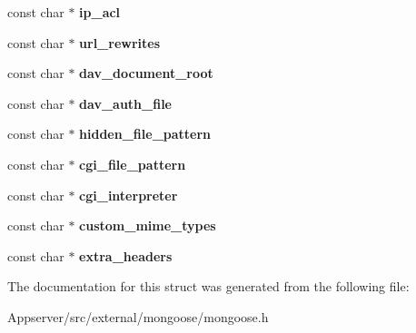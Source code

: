 \begin{DoxyCompactItemize}
\item 
const char $\ast$ {\bfseries ip\+\_\+acl}\hypertarget{structmg__serve__http__opts_a6227e7145e0543137d872add4d0e1851}{}\label{structmg__serve__http__opts_a6227e7145e0543137d872add4d0e1851}

\item 
const char $\ast$ {\bfseries url\+\_\+rewrites}\hypertarget{structmg__serve__http__opts_a3e1aad9c1180b840b44aa80d2190d82c}{}\label{structmg__serve__http__opts_a3e1aad9c1180b840b44aa80d2190d82c}

\item 
const char $\ast$ {\bfseries dav\+\_\+document\+\_\+root}\hypertarget{structmg__serve__http__opts_ae7463ec9b4042b02f1ab7e6a8c701e36}{}\label{structmg__serve__http__opts_ae7463ec9b4042b02f1ab7e6a8c701e36}

\item 
const char $\ast$ {\bfseries dav\+\_\+auth\+\_\+file}\hypertarget{structmg__serve__http__opts_a9e99bf7d50a0bda5a343c1ee4dddfa2d}{}\label{structmg__serve__http__opts_a9e99bf7d50a0bda5a343c1ee4dddfa2d}

\item 
const char $\ast$ {\bfseries hidden\+\_\+file\+\_\+pattern}\hypertarget{structmg__serve__http__opts_ab9bf54bf13d81fd15eecddffe10b202b}{}\label{structmg__serve__http__opts_ab9bf54bf13d81fd15eecddffe10b202b}

\item 
const char $\ast$ {\bfseries cgi\+\_\+file\+\_\+pattern}\hypertarget{structmg__serve__http__opts_a615be9b5d7eb95c7061d963a2ab01411}{}\label{structmg__serve__http__opts_a615be9b5d7eb95c7061d963a2ab01411}

\item 
const char $\ast$ {\bfseries cgi\+\_\+interpreter}\hypertarget{structmg__serve__http__opts_a6b9e5e3478a1ea8b73b799658ecc1722}{}\label{structmg__serve__http__opts_a6b9e5e3478a1ea8b73b799658ecc1722}

\item 
const char $\ast$ {\bfseries custom\+\_\+mime\+\_\+types}\hypertarget{structmg__serve__http__opts_abf550db3516fae8bcaea74a04582c2f1}{}\label{structmg__serve__http__opts_abf550db3516fae8bcaea74a04582c2f1}

\item 
const char $\ast$ {\bfseries extra\+\_\+headers}\hypertarget{structmg__serve__http__opts_a2ceb4e92e6965918149c238ae9979310}{}\label{structmg__serve__http__opts_a2ceb4e92e6965918149c238ae9979310}

\end{DoxyCompactItemize}


The documentation for this struct was generated from the following file\+:\begin{DoxyCompactItemize}
\item 
Appserver/src/external/mongoose/mongoose.\+h\end{DoxyCompactItemize}
